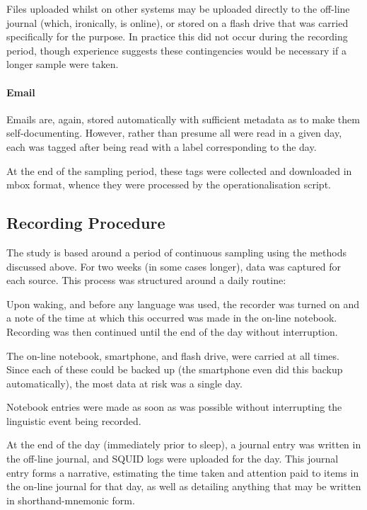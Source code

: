 Files uploaded whilst on other systems may be uploaded directly to the off-line journal (which, ironically, is online), or stored on a flash drive that was carried specifically for the purpose.  In practice this did not occur during the recording period, though experience suggests these contingencies would be necessary if a longer sample were taken.

\paragraph{Email}
Emails are, again, stored automatically with sufficient metadata as to make them self-documenting.  However, rather than presume all were read in a given day, each was tagged after being read with a label corresponding to the day.

At the end of the sampling period, these tags were collected and downloaded in mbox format, whence they were processed by the operationalisation script.









\subsection{Recording Procedure}
\label{sec:personal:method:recording}
The study is based around a period of continuous sampling using the methods discussed above.  For two weeks (in some cases longer), data was captured for each source.  This process was structured around a daily routine:

Upon waking, and before any language was used, the recorder was turned on and a note of the time at which this occurred was made in the on-line notebook.  Recording was then continued until the end of the day without interruption.

The on-line notebook, smartphone, and flash drive, were carried at all times.  Since each of these could be backed up (the smartphone even did this backup automatically), the most data at risk was a single day.

Notebook entries were made as soon as was possible without interrupting the linguistic event being recorded.

At the end of the day (immediately prior to sleep), a journal entry was written in the off-line journal, and SQUID logs were uploaded for the day.  This journal entry forms a narrative, estimating the time taken and attention paid to items in the on-line journal for that day, as well as detailing anything that may be written in shorthand-mnemonic form.










